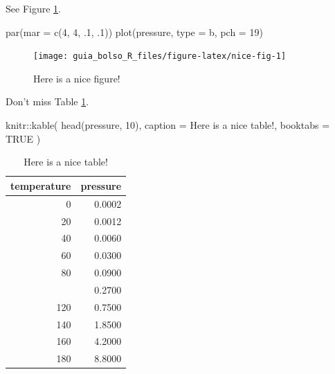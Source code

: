 \documentclass[
]{book}
\newenvironment{Shaded}{\begin{snugshade}}{\end{snugshade}}
\newcommand{\AttributeTok}[1]{\textcolor[rgb]{0.77,0.63,0.00}{#1}}
\newcommand{\ConstantTok}[1]{\textcolor[rgb]{0.00,0.00,0.00}{#1}}
\newcommand{\DecValTok}[1]{\textcolor[rgb]{0.00,0.00,0.81}{#1}}
\newcommand{\FunctionTok}[1]{\textcolor[rgb]{0.00,0.00,0.00}{#1}}
\newcommand{\NormalTok}[1]{#1}
\newcommand{\SpecialCharTok}[1]{\textcolor[rgb]{0.00,0.00,0.00}{#1}}
\newcommand{\StringTok}[1]{\textcolor[rgb]{0.31,0.60,0.02}{#1}}
\theoremstyle{definition}
\theoremstyle{definition}
\theoremstyle{definition}
\theoremstyle{definition}
\theoremstyle{remark}
\begin{document}
See Figure \ref{fig:nice-fig}.

\begin{Shaded}
\begin{Highlighting}[]
\FunctionTok{par}\NormalTok{(}\AttributeTok{mar =} \FunctionTok{c}\NormalTok{(}\DecValTok{4}\NormalTok{, }\DecValTok{4}\NormalTok{, .}\DecValTok{1}\NormalTok{, .}\DecValTok{1}\NormalTok{))}
\FunctionTok{plot}\NormalTok{(pressure, }\AttributeTok{type =} \StringTok{\textquotesingle{}b\textquotesingle{}}\NormalTok{, }\AttributeTok{pch =} \DecValTok{19}\NormalTok{)}
\end{Highlighting}
\end{Shaded}

\begin{figure}

{\centering \texttt{[image: guia\_bolso\_R\_files/figure-latex/nice-fig-1]} 

}

\caption{Here is a nice figure!}\label{fig:nice-fig}
\end{figure}

Don't miss Table \ref{tab:nice-tab}.

\begin{Shaded}
\begin{Highlighting}[]
\NormalTok{knitr}\SpecialCharTok{::}\FunctionTok{kable}\NormalTok{(}
  \FunctionTok{head}\NormalTok{(pressure, }\DecValTok{10}\NormalTok{), }\AttributeTok{caption =} \StringTok{\textquotesingle{}Here is a nice table!\textquotesingle{}}\NormalTok{,}
  \AttributeTok{booktabs =} \ConstantTok{TRUE}
\NormalTok{)}
\end{Highlighting}
\end{Shaded}

\begin{table}

\caption{\label{tab:nice-tab}Here is a nice table!}
\centering
\begin{tabular}[t]{rr}
\toprule
temperature & pressure\\
\midrule
0 & 0.0002\\
20 & 0.0012\\
40 & 0.0060\\
60 & 0.0300\\
80 & 0.0900\\
\addlinespace
100 & 0.2700\\
120 & 0.7500\\
140 & 1.8500\\
160 & 4.2000\\
180 & 8.8000\\
\bottomrule
\end{tabular}
\end{table}
\end{document}
